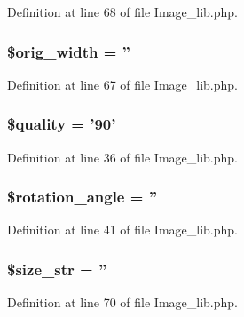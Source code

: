 Definition at line 68 of file Image\-\_\-lib.\-php.

\subsubsection[{\$orig\-\_\-width}]{\setlength{\rightskip}{0pt plus 5cm}\$orig\-\_\-width = ''}\label{class_c_i___image__lib_a336a3be3539aaae0ad42aaf4c544bb41}


Definition at line 67 of file Image\-\_\-lib.\-php.

\subsubsection[{\$quality}]{\setlength{\rightskip}{0pt plus 5cm}\$quality = '90'}\label{class_c_i___image__lib_a0e342ea32cccdc2c932ad23b9796a62a}


Definition at line 36 of file Image\-\_\-lib.\-php.

\subsubsection[{\$rotation\-\_\-angle}]{\setlength{\rightskip}{0pt plus 5cm}\$rotation\-\_\-angle = ''}\label{class_c_i___image__lib_a9410d2e216c0c1dd852031f2a39e7ec7}


Definition at line 41 of file Image\-\_\-lib.\-php.

\subsubsection[{\$size\-\_\-str}]{\setlength{\rightskip}{0pt plus 5cm}\$size\-\_\-str = ''}\label{class_c_i___image__lib_aff68567b98390e0db61065df80af5d49}


Definition at line 70 of file Image\-\_\-lib.\-php.

